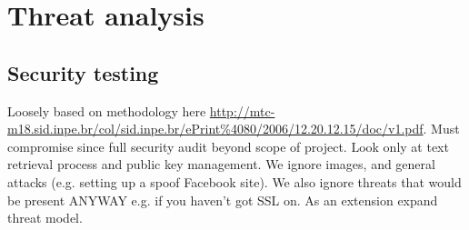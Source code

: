 \chapter{Threat analysis}

\FloatBarrier
\section{Security testing}

Loosely based on methodology here \url{http://mtc-m18.sid.inpe.br/col/sid.inpe.br/ePrint\%4080/2006/12.20.12.15/doc/v1.pdf}. Must compromise since full security audit beyond scope of project. Look only at text retrieval process and public key management. We ignore images, and general attacks (e.g. setting up a spoof Facebook site). We also ignore threats that would be present ANYWAY e.g. if you haven't got SSL on. As an extension expand threat model.

